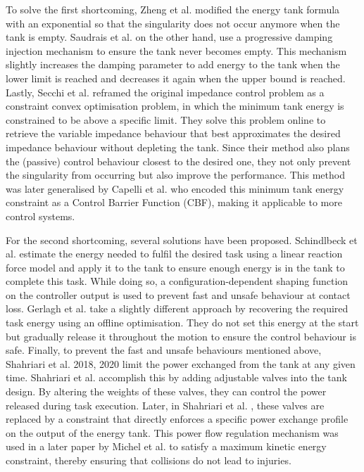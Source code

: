 To solve the first shortcoming, Zheng et al. \cite{zhengTimeVaryingImpedanceControl2018} modified the energy tank formula with an exponential so that the singularity does not occur anymore when the tank is empty. Saudrais et al. \cite{saudraisRateModeBilateral2021} on the other hand, use a progressive damping injection mechanism to ensure the tank never becomes empty. This mechanism slightly increases the damping parameter to add energy to the tank when the lower limit is reached and decreases it again when the upper bound is reached. Lastly, Secchi et al. \cite{secchiEnergyOptimizationRobust2019} reframed the original impedance control problem as a constraint convex optimisation problem, in which the minimum tank energy is constrained to be above a specific limit. They solve this problem online to retrieve the variable impedance behaviour that best approximates the desired impedance behaviour without depleting the tank. Since their method also plans the (passive) control behaviour closest to the desired one, they not only prevent the singularity from occurring but also improve the performance. This method was later generalised by Capelli et al. \cite{capelliPassivityControlBarrier2022} who encoded this minimum tank energy constraint as a Control Barrier Function (CBF), making it applicable to more control systems.

For the second shortcoming, several solutions have been proposed. Schindlbeck et al. \cite{schindlbeckUnifiedPassivitybasedCartesian2015} estimate the energy needed to fulfil the desired task using a linear reaction force model and apply it to the tank to ensure enough energy is in the tank to complete this task. While doing so, a configuration-dependent shaping function on the controller output is used to prevent fast and unsafe behaviour at contact loss. Gerlagh et al. \cite{gerlaghEnergyawareAdaptiveImpedance2021} take a slightly different approach by recovering the required task energy using an offline optimisation. They do not set this energy at the start but gradually release it throughout the motion to ensure the control behaviour is safe. Finally, to prevent the fast and unsafe behaviours mentioned above, Shahriari et al. 2018, 2020 \cite{shahriariValvebasedVirtualEnergy2018,shahriariPowerFlowRegulation2020} limit the power exchanged from the tank at any given time. Shahriari et al. \cite{shahriariValvebasedVirtualEnergy2018} accomplish this by adding adjustable valves into the tank design. By altering the weights of these valves, they can control the power released during task execution. Later, in Shahriari et al. \cite{shahriariPowerFlowRegulation2020}, these valves are replaced by a constraint that directly enforces a specific power exchange profile on the output of the energy tank. This power flow regulation mechanism was used in a later paper by Michel et al. \cite{michelSafetyAwareHierarchicalPassivityBased2022} to satisfy a maximum kinetic energy constraint, thereby ensuring that collisions do not lead to injuries.

